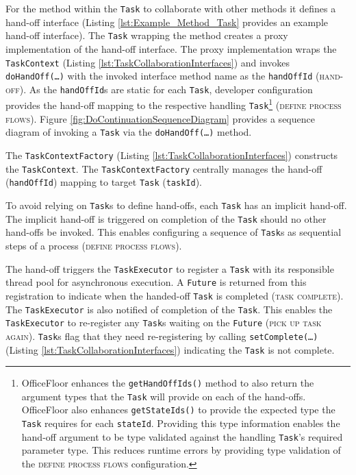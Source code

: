 \documentclass[prodmode]{style/acmlarge}
\begin{document}
For the method within the \texttt{Task} to collaborate with other methods it
defines a hand-off interface (Listing \ref{lst:Example_Method_Task} provides an
example hand-off interface).  The \texttt{Task} wrapping the method creates a
proxy implementation of the hand-off interface.  The proxy implementation wraps
the \texttt{TaskContext} (Listing \ref{lst:TaskCollaborationInterfaces}) and
invokes \texttt{doHandOff(\ldots)} with the invoked interface method name as the
\texttt{handOffId} (\textsc{hand-off}).  As the \texttt{handOffId}s are static
for each \texttt{Task}, developer configuration provides the hand-off mapping to
the respective handling \texttt{Task}\footnote{OfficeFloor enhances the
\texttt{getHandOffIds()} method to also return the argument types that the
\texttt{Task} will provide on each of the hand-offs.  OfficeFloor also enhances
\texttt{getStateIds()} to provide the expected type the \texttt{Task} requires
for each \texttt{stateId}. Providing this type information enables the hand-off
argument to be type validated against the handling \texttt{Task}'s required
parameter type.  This reduces runtime errors by providing type validation of the
\textsc{define process flows} configuration.} (\textsc{define process flows}). 
Figure \ref{fig:DoContinuationSequenceDiagram} provides a sequence diagram of
invoking a \texttt{Task} via the \texttt{doHandOff(\ldots)} method.

The \texttt{TaskContextFactory} (Listing \ref{lst:TaskCollaborationInterfaces})
constructs the \texttt{TaskContext}.  The \texttt{TaskContextFactory} centrally
manages the hand-off (\texttt{handOffId}) mapping to target \texttt{Task}
(\texttt{taskId}).

To avoid relying on \texttt{Task}s to define hand-offs, each \texttt{Task} has
an implicit hand-off.  The implicit hand-off is triggered on completion of the
\texttt{Task} should no other hand-offs be invoked.  This enables configuring a
sequence of \texttt{Task}s as sequential steps of a process (\textsc{define
process flows}).

The hand-off triggers the \texttt{TaskExecutor} to register a \texttt{Task} with
its responsible thread pool for asynchronous execution.  A \texttt{Future} is
returned from this registration to indicate when the handed-off \texttt{Task} is
completed (\textsc{task complete}).  The \texttt{TaskExecutor} is also notified
of completion of the \texttt{Task}.  This enables the \texttt{TaskExecutor} to
re-register any \texttt{Task}s waiting on the \texttt{Future} (\textsc{pick up
task again}).  \texttt{Task}s flag that they need re-registering by calling
\texttt{setComplete(\ldots)} (Listing \ref{lst:TaskCollaborationInterfaces})
indicating the \texttt{Task} is not complete.
\end{document}
